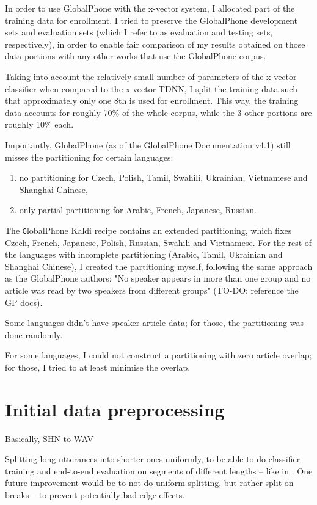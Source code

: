\documentclass[bsc,frontabs,twoside,singlespacing,parskip,deptreport]{infthesis}
\begin{document}
{{    In order to use GlobalPhone with the x-vector system, I allocated part of the training data for enrollment. I tried to preserve the GlobalPhone development sets and evaluation sets (which I refer to as evaluation and testing sets, respectively), in order to enable fair comparison of my results obtained on those data portions with any other works that use the GlobalPhone corpus.

    Taking into account the relatively small number of parameters of the x-vector classifier when compared to the x-vector TDNN, I split the training data such that approximately only one 8th is used for enrollment. This way, the training data accounts for roughly 70\% of the whole corpus, while the 3 other portions are roughly 10\% each.

    Importantly, GlobalPhone (as of the GlobalPhone Documentation v4.1) still misses the partitioning for certain languages:
    \begin{enumerate}
      \item {no partitioning for Czech, Polish, Tamil, Swahili, Ukrainian, Vietnamese and Shanghai Chinese,}
      \item {only partial partitioning for Arabic, French, Japanese, Russian.}
    \end{enumerate}

    The {\texttt GlobalPhone} Kaldi recipe contains an extended partitioning, which fixes Czech, French, Japanese, Polish, Russian, Swahili and Vietnamese. For the rest of the languages with incomplete partitioning (Arabic, Tamil, Ukrainian and Shanghai Chinese), I created the partitioning myself, following the same approach as the GlobalPhone authors: "No speaker appears in more than one group and no article was read by two speakers from different groups" (TO-DO: reference the GP docs).

    Some languages didn't have speaker-article data; for those, the partitioning was done randomly.

    For some languages, I could not construct a partitioning with zero article overlap; for those, I tried to at least minimise the overlap.    
  }

  \section{Initial data preprocessing}{
    Basically, SHN to WAV

    Splitting long utterances into shorter ones uniformly, to be able to do classifier training and end-to-end evaluation on segments of different lengths -- like in \cite{Snyder_et_al_2018}. One future improvement would be to not do uniform splitting, but rather split on breaks -- to prevent potentially bad edge effects.
  }

}
\end{document}
